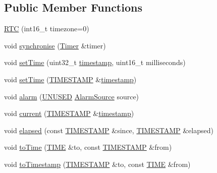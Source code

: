 \subsection*{Public Member Functions}
\begin{DoxyCompactItemize}
\item 
\hyperlink{classflame_1_1_r_t_c_a1345e2aa25662edb07a4c0d11ef7db26}{R\-T\-C} (int16\-\_\-t timezone=0)
\item 
void \hyperlink{classflame_1_1_r_t_c_afbabe09cc9b0311bf4ae7871b93ad692}{synchronise} (\hyperlink{classflame_1_1_timer}{Timer} \&timer)
\item 
void \hyperlink{classflame_1_1_r_t_c_a86aa2ab02475f073179c2b2db51312e8}{set\-Time} (uint32\-\_\-t \hyperlink{structflame_1_1timestamp}{timestamp}, uint16\-\_\-t milliseconds)
\item 
void \hyperlink{classflame_1_1_r_t_c_aa806fd984f19bf88515b982b31188d0b}{set\-Time} (\hyperlink{namespaceflame_ad90347e9ea7e54907966260ec5c7d22f}{T\-I\-M\-E\-S\-T\-A\-M\-P} \&\hyperlink{structflame_1_1timestamp}{timestamp})
\item 
void \hyperlink{classflame_1_1_r_t_c_a7198ccc25a55472063750e91ecb2e442}{alarm} (\hyperlink{io_8h_addf5ec070e9499d36b7f2009ce736076}{U\-N\-U\-S\-E\-D} \hyperlink{namespaceflame_a6d176ba245556716fd3e32006bb7cfe5}{Alarm\-Source} source)
\item 
void \hyperlink{classflame_1_1_r_t_c_ab62acf26f8d8930440e37b4eff8ad630}{current} (\hyperlink{namespaceflame_ad90347e9ea7e54907966260ec5c7d22f}{T\-I\-M\-E\-S\-T\-A\-M\-P} \&\hyperlink{structflame_1_1timestamp}{timestamp})
\item 
void \hyperlink{classflame_1_1_r_t_c_af2287ccb064da38fc546f76cf88c1e53}{elapsed} (const \hyperlink{namespaceflame_ad90347e9ea7e54907966260ec5c7d22f}{T\-I\-M\-E\-S\-T\-A\-M\-P} \&since, \hyperlink{namespaceflame_ad90347e9ea7e54907966260ec5c7d22f}{T\-I\-M\-E\-S\-T\-A\-M\-P} \&elapsed)
\item 
void \hyperlink{classflame_1_1_r_t_c_afaf9a803ca66b58067b24f879edec821}{to\-Time} (\hyperlink{namespaceflame_a961fbb5da27b8d64aa0dfc18f55b2be6}{T\-I\-M\-E} \&to, const \hyperlink{namespaceflame_ad90347e9ea7e54907966260ec5c7d22f}{T\-I\-M\-E\-S\-T\-A\-M\-P} \&from)
\item 
void \hyperlink{classflame_1_1_r_t_c_a8cf9824b2f59a91c6d2310640927f6ae}{to\-Timestamp} (\hyperlink{namespaceflame_ad90347e9ea7e54907966260ec5c7d22f}{T\-I\-M\-E\-S\-T\-A\-M\-P} \&to, const \hyperlink{namespaceflame_a961fbb5da27b8d64aa0dfc18f55b2be6}{T\-I\-M\-E} \&from)
\item 

\end{DoxyCompactItemize}
